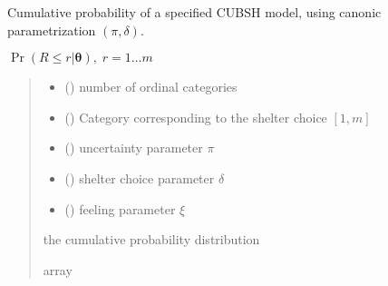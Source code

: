 \documentclass[letterpaper,10pt,english]{sphinxmanual}
\begin{document}
\begin{fulllineitems}
\label{\detokenize{cubmods:cubmods.cubsh.cmf_delta}}
\pysigstartsignatures
{}
\pysigstopsignatures
\sphinxAtStartPar
Cumulative probability of a specified CUBSH model,
using canonic parametrization \((\pi, \delta)\).

\sphinxAtStartPar
\(\Pr(R \leq r | \pmb\theta),\; r=1 \ldots m\)
\begin{quote}\begin{description}
\begin{itemize}
\item {} 
\sphinxAtStartPar
{} () \textendash{} number of ordinal categories

\item {} 
\sphinxAtStartPar
{} () \textendash{} Category corresponding to the shelter choice \([1,m]\)

\item {} 
\sphinxAtStartPar
{} () \textendash{} uncertainty parameter \(\pi\)

\item {} 
\sphinxAtStartPar
{} () \textendash{} shelter choice parameter \(\delta\)

\item {} 
\sphinxAtStartPar
{} () \textendash{} feeling parameter \(\xi\)

\end{itemize}

\sphinxAtStartPar
the cumulative probability distribution

\sphinxAtStartPar
array

\end{description}\end{quote}

\end{fulllineitems}
\end{document}
